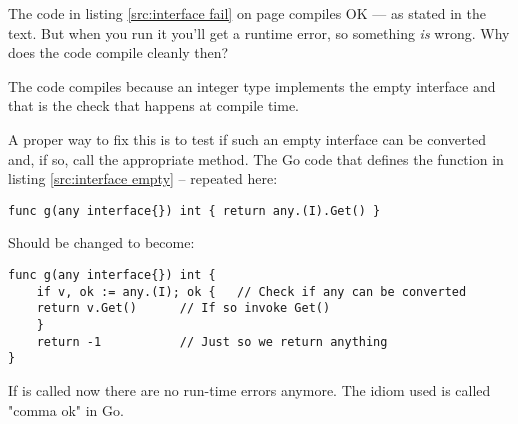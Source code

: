 \begin{Exercise}[title={Interfaces and compilation},difficulty=6]
\Question
The code in listing \ref{src:interface fail} on page
\pageref{src:interface fail} compiles OK --- as stated 
in the text. But when you run it you'll get a runtime error, so
something \emph{is} wrong. Why does the code compile cleanly then?
\end{Exercise}

\begin{Answer}
\Question
The code compiles because an integer type implements the empty interface
and that is the check that happens at compile time.

A proper way to fix this is to test if such an empty interface can
be converted and, if so, call the appropriate method. The Go code
that defines the function  in listing \ref{src:interface empty}
-- repeated here:
\begin{lstlisting}
func g(any interface{}) int { return any.(I).Get() }
\end{lstlisting}

\noindent{}Should be changed to become:
\begin{lstlisting}
func g(any interface{}) int {
    if v, ok := any.(I); ok {	// Check if any can be converted
	return v.Get()		// If so invoke Get()
    }
    return -1			// Just so we return anything
}
\end{lstlisting}
If  is called now there are no run-time errors anymore. The
idiom used is called "comma ok" in Go.
\end{Answer}
